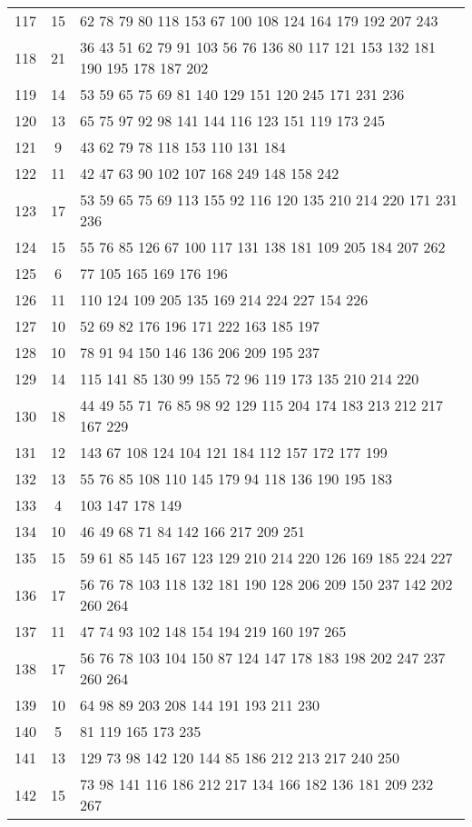 \documentclass{standalone}
\begin{document}
\begin{tabular}{c c l}
117 & 15 & 62 78 79 80 118 153 67 100 108 124 164 179 192 207 243 \\
118 & 21 & 36 43 51 62 79 91 103 56 76 136 80 117 121 153 132 181 190 195 178 187 202 \\
119 & 14 & 53 59 65 75 69 81 140 129 151 120 245 171 231 236 \\
120 & 13 & 65 75 97 92 98 141 144 116 123 151 119 173 245 \\
121 & 9 & 43 62 79 78 118 153 110 131 184 \\
122 & 11 & 42 47 63 90 102 107 168 249 148 158 242 \\
123 & 17 & 53 59 65 75 69 113 155 92 116 120 135 210 214 220 171 231 236 \\
124 & 15 & 55 76 85 126 67 100 117 131 138 181 109 205 184 207 262 \\
125 & 6 & 77 105 165 169 176 196 \\
126 & 11 & 110 124 109 205 135 169 214 224 227 154 226 \\
127 & 10 & 52 69 82 176 196 171 222 163 185 197 \\
128 & 10 & 78 91 94 150 146 136 206 209 195 237 \\
129 & 14 & 115 141 85 130 99 155 72 96 119 173 135 210 214 220 \\
130 & 18 & 44 49 55 71 76 85 98 92 129 115 204 174 183 213 212 217 167 229 \\
131 & 12 & 143 67 108 124 104 121 184 112 157 172 177 199 \\
132 & 13 & 55 76 85 108 110 145 179 94 118 136 190 195 183 \\
133 & 4 & 103 147 178 149 \\
134 & 10 & 46 49 68 71 84 142 166 217 209 251 \\
135 & 15 & 59 61 85 145 167 123 129 210 214 220 126 169 185 224 227 \\
136 & 17 & 56 76 78 103 118 132 181 190 128 206 209 150 237 142 202 260 264 \\
137 & 11 & 47 74 93 102 148 154 194 219 160 197 265 \\
138 & 17 & 56 76 78 103 104 150 87 124 147 178 183 198 202 247 237 260 264 \\
139 & 10 & 64 98 89 203 208 144 191 193 211 230 \\
140 & 5 & 81 119 165 173 235 \\
141 & 13 & 129 73 98 142 120 144 85 186 212 213 217 240 250 \\
142 & 15 & 73 98 141 116 186 212 217 134 166 182 136 181 209 232 267 \\

\end{tabular}
\end{document}
